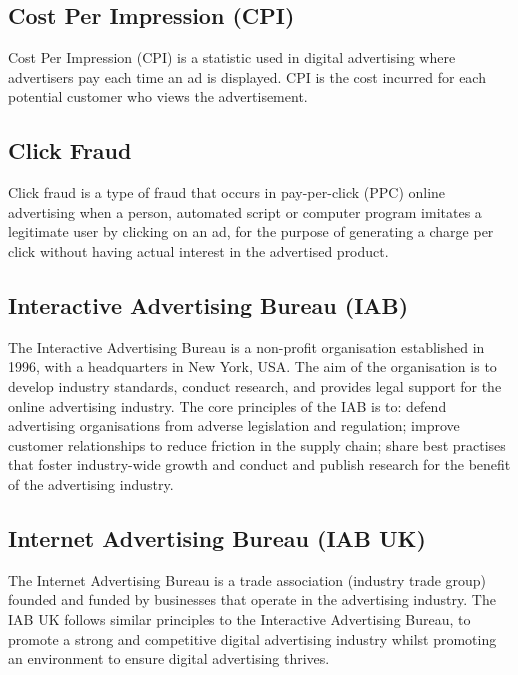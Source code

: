 \documentclass[12pt]{article}
\begin{document}
\subsection{Cost Per Impression (CPI)}
Cost Per Impression (CPI) is a statistic used in digital advertising where advertisers pay each time an ad is displayed. CPI is the cost incurred for each potential customer who views the advertisement.

\subsection{Click Fraud}
Click fraud is a type of fraud that occurs in pay-per-click (PPC) online advertising when a person, automated script or computer program imitates a legitimate user by clicking on an ad, for the purpose of generating a charge per click without having actual interest in the advertised product.

\subsection{Interactive Advertising Bureau (IAB)}
The Interactive Advertising Bureau is a non-profit organisation established in 1996, with a headquarters in New York, USA. The aim of the organisation is to develop industry standards, conduct research, and provides legal support for the online advertising industry. The core principles of the IAB is to: defend advertising organisations from adverse legislation and regulation; improve customer relationships to reduce friction in the supply chain; share best practises that foster industry-wide growth and conduct and publish research for the benefit of the advertising industry.

\subsection{ Internet Advertising Bureau (IAB UK)}
The Internet Advertising Bureau is a trade association (industry trade group) founded and funded by businesses that operate in the advertising industry. The IAB UK follows similar principles to the Interactive Advertising Bureau, to promote a strong and competitive digital advertising industry whilst promoting an environment to ensure digital advertising thrives. 

\medskip
\printbibliography
\end{document}
